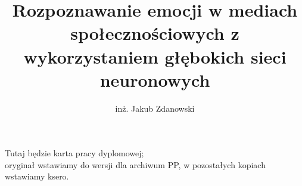 \documentclass[11pt,polish,a4paper,oneside]{ppfcmthesis}
\author{%
   inż. Jakub Zdanowski \album{127239}
}
\title{Rozpoznawanie emocji w mediach społecznościowych z wykorzystaniem głębokich sieci neuronowych}
\begin{document}
\frontmatter\pagestyle{empty}%
\maketitle\cleardoublepage%


\thispagestyle{empty}\vspace*{\fill}%
\begin{center}Tutaj będzie karta pracy dyplomowej;\\oryginał wstawiamy do wersji dla archiwum PP, w pozostałych kopiach wstawiamy ksero.\end{center}%
\vfill\cleardoublepage%


\pagestyle{ppfcmthesis}%
\tableofcontents* 
\cleardoublepage %


\mainmatter%









{\raggedright\sloppy\small}


\cleardoublepage\appendix%
\newpage



\ppcolophon
\end{document}
